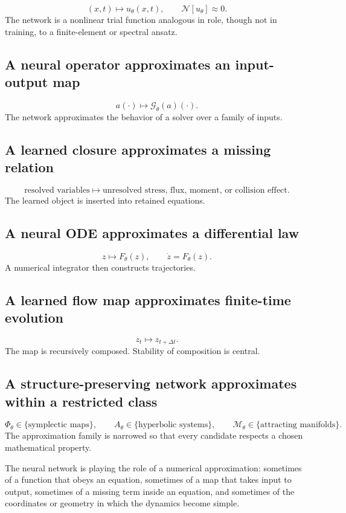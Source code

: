 \documentclass[11pt]{article}
\newcommand{\G}{\mathcal{G}}
\newcommand{\N}{\mathcal{N}}
\newcommand{\M}{\mathcal{M}}
\begin{document}
\[
 (x,t)\longmapsto u_\theta(x,t),
 \qquad
 \N[u_\theta]\approx0.
\]
The network is a nonlinear trial function analogous in role, though not in training, to a finite-element or spectral ansatz.

\subsection{A neural operator approximates an input-output map}

\[
 a(\cdot)\longmapsto\G_\theta(a)(\cdot).
\]
The network approximates the behavior of a solver over a family of inputs.

\subsection{A learned closure approximates a missing relation}

\[
 \text{resolved variables}
 \longmapsto
 \text{unresolved stress, flux, moment, or collision effect}.
\]
The learned object is inserted into retained equations.

\subsection{A neural ODE approximates a differential law}

\[
 z\longmapsto F_\theta(z),
 \qquad
 \dot z=F_\theta(z).
\]
A numerical integrator then constructs trajectories.

\subsection{A learned flow map approximates finite-time evolution}

\[
 z_t\longmapsto z_{t+\Delta t}.
\]
The map is recursively composed. Stability of composition is central.

\subsection{A structure-preserving network approximates within a restricted class}

\[
 \Phi_\theta\in\{\text{symplectic maps}\},
 \qquad
 A_\theta\in\{\text{hyperbolic systems}\},
 \qquad
 \M_\theta\in\{\text{attracting manifolds}\}.
\]
The approximation family is narrowed so that every candidate respects a chosen mathematical property.

\begin{bigidea}
The neural network is playing the role of a numerical approximation: sometimes of a function that obeys an equation, sometimes of a map that takes input to output, sometimes of a missing term inside an equation, and sometimes of the coordinates or geometry in which the dynamics become simple.
\end{bigidea}
\end{document}
